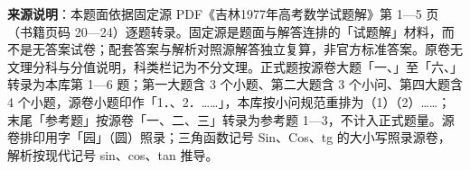 


\begin{gktip}
\textbf{来源说明}：本题面依据固定源 PDF《吉林1977年高考数学试题解》第 1—5 页（书籍页码 20—24）逐题转录。固定源是题面与解答连排的「试题解」材料，而不是无答案试卷；配套答案与解析对照源解答独立复算，非官方标准答案。原卷无文理分科与分值说明，科类栏记为不分文理。正式题按源卷大题「一、」至「六、」转录为本库第 1—6 题；第一大题含 3 个小题、第二大题含 3 个小问、第四大题含 4 个小题，源卷小题印作「1．、2．……」，本库按小问规范重排为（1）（2）……；末尾「参考题」按源卷「一、二、三」转录为参考题 1—3，不计入正式题量。源卷排印用字「园」（圆）照录；三角函数记号 Sin、Cos、tg 的大小写照录源卷，解析按现代记号 sin、cos、tan 推导。
\end{gktip}

\par\medskip


